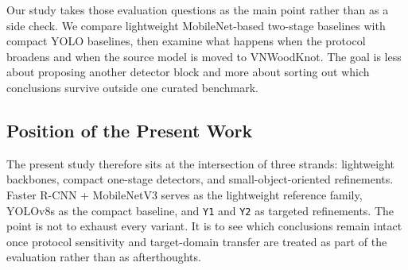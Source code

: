 Our study takes those evaluation questions as the main point rather than as a side check. We compare lightweight MobileNet-based two-stage baselines with compact YOLO baselines, then examine what happens when the protocol broadens and when the source model is moved to VNWoodKnot. The goal is less about proposing another detector block and more about sorting out which conclusions survive outside one curated benchmark.

\subsection{Position of the Present Work}

The present study therefore sits at the intersection of three strands: lightweight backbones, compact one-stage detectors, and small-object-oriented refinements. Faster R-CNN + MobileNetV3 serves as the lightweight reference family, YOLOv8s as the compact baseline, and \texttt{Y1} and \texttt{Y2} as targeted refinements. The point is not to exhaust every variant. It is to see which conclusions remain intact once protocol sensitivity and target-domain transfer are treated as part of the evaluation rather than as afterthoughts.
